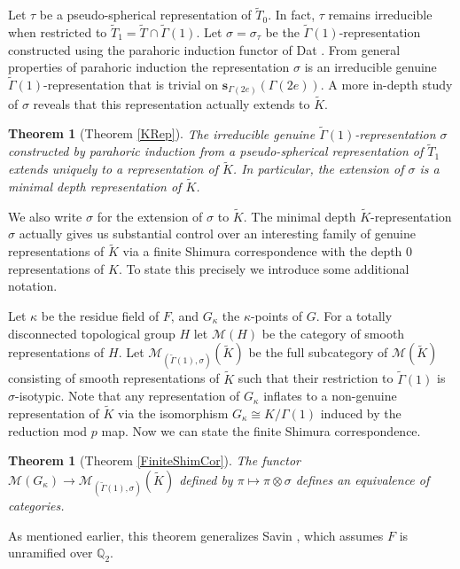 \documentclass[10pt, letterpaper]{amsart}
\theoremstyle{plain}
\newtheorem{Thm}[equation]{Theorem}
\theoremstyle{definition}
\numberwithin{equation}{section}
\newcommand{\Q}{\mathbb{Q}}
\newcommand{\Kt}{\widetilde{K}}
\newcommand{\Tt}{\widetilde{T}}
\newcommand{\Gammat}{\widetilde{\Gamma}}
\newcommand{\s}{\mathbf{s}}
\begin{document}
Let $\tau$ be a pseudo-spherical representation of $\Tt_{0}$. In fact, $\tau$ remains irreducible when restricted to $\Tt_{1}=\Tt\cap \Gammat(1)$. Let $\sigma=\sigma_{\tau}$ be the $\Gammat(1)$-representation constructed using the parahoric induction functor of Dat \cite[Section 2.6]{D09}. From general properties of parahoric induction the representation $\sigma$ is an irreducible genuine $\Gammat(1)$-representation that is trivial on $\s_{\Gamma(2e)}(\Gamma(2e))$. A more in-depth study of $\sigma$ reveals that this representation actually extends to $\Kt$.

\begin{Thm}[Theorem \ref{KRep}]\label{P:sigma_extends_to_K_Intro}
    The irreducible genuine $\Gammat(1)$-representation $\sigma$ constructed by parahoric induction from a pseudo-spherical representation of $\Tt_{1}$ extends uniquely to a representation of $\Kt$. In particular, the extension of $\sigma$ is a minimal depth representation of $\Kt$.
\end{Thm}

We also write $\sigma$ for the extension of $\sigma$ to $\Kt$. The minimal depth $\Kt$-representation $\sigma$ actually gives us substantial control over an interesting family of genuine representations of $\Kt$ via a finite Shimura correspondence with the depth $0$ representations of $K$. To state this precisely we introduce some additional notation. 

Let $\kappa$ be the residue field of $F$, and $G_\kappa$ the $\kappa$-points of $G$. For a totally disconnected topological group $H$ let $\mathcal{M}(H)$ be the category of smooth representations of $H$. Let $\mathcal{M}_{(\Gammat(1),\sigma)}(\Kt)$ be the full subcategory of $\mathcal{M}(\Kt)$ consisting of smooth representations of $\Kt$ such that their restriction to $\Gammat(1)$ is $\sigma$-isotypic. Note that any representation of $G_{\kappa}$ inflates to a non-genuine representation of $\Kt$ via the isomorphism $G_{\kappa}\cong K/\Gamma(1)$ induced by the reduction mod $p$ map. Now we can state the finite Shimura correspondence.

\begin{Thm}[Theorem \ref{FiniteShimCor}]
The functor $\mathcal{M}(G_{\kappa})\rightarrow \mathcal{M}_{(\Gammat(1),\sigma)}(\Kt)$ defined by $\pi\mapsto \pi\otimes\sigma$ defines an equivalence of categories. %
\end{Thm}
As mentioned earlier, this theorem generalizes Savin \cite[Theorem 4.1]{S12}, which assumes $F$ is unramified over $\Q_2$.
\end{document}
